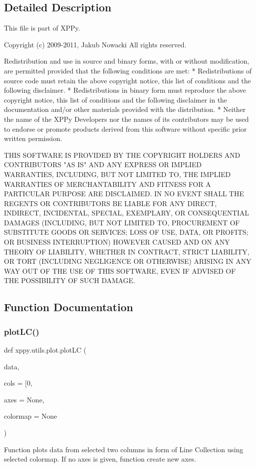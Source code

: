 \subsection{Detailed Description}
\begin{DoxyVerb}This file is part of XPPy.

Copyright (c) 2009-2011, Jakub Nowacki
All rights reserved.

Redistribution and use in source and binary forms, with or without
modification, are permitted provided that the following conditions are met:
    * Redistributions of source code must retain the above copyright
      notice, this list of conditions and the following disclaimer.
    * Redistributions in binary form must reproduce the above copyright
      notice, this list of conditions and the following disclaimer in the
      documentation and/or other materials provided with the distribution.
    * Neither the name of the XPPy Developers nor the
      names of its contributors may be used to endorse or promote products
      derived from this software without specific prior written permission.

THIS SOFTWARE IS PROVIDED BY THE COPYRIGHT HOLDERS AND CONTRIBUTORS "AS IS" AND
ANY EXPRESS OR IMPLIED WARRANTIES, INCLUDING, BUT NOT LIMITED TO, THE IMPLIED
WARRANTIES OF MERCHANTABILITY AND FITNESS FOR A PARTICULAR PURPOSE ARE
DISCLAIMED. IN NO EVENT SHALL THE REGENTS OR CONTRIBUTORS BE LIABLE FOR ANY
DIRECT, INDIRECT, INCIDENTAL, SPECIAL, EXEMPLARY, OR CONSEQUENTIAL DAMAGES
(INCLUDING, BUT NOT LIMITED TO, PROCUREMENT OF SUBSTITUTE GOODS OR SERVICES;
LOSS OF USE, DATA, OR PROFITS; OR BUSINESS INTERRUPTION) HOWEVER CAUSED AND
ON ANY THEORY OF LIABILITY, WHETHER IN CONTRACT, STRICT LIABILITY, OR TORT
(INCLUDING NEGLIGENCE OR OTHERWISE) ARISING IN ANY WAY OUT OF THE USE OF THIS
SOFTWARE, EVEN IF ADVISED OF THE POSSIBILITY OF SUCH DAMAGE.
\end{DoxyVerb}
 

\subsection{Function Documentation}
\mbox{\label{namespacexppy_1_1utils_1_1plot_a76a5b63c867b8095130516cdba1c7533}} 
\subsubsection{\texorpdfstring{plot\+L\+C()}{plotLC()}}
{\footnotesize\ttfamily def xppy.\+utils.\+plot.\+plot\+LC (\begin{DoxyParamCaption}\item[{}]{data,  }\item[{}]{cols = {\ttfamily \mbox{[}0},  }\item[{}]{axes = {\ttfamily None},  }\item[{}]{colormap = {\ttfamily None} }\end{DoxyParamCaption})}

\begin{DoxyVerb}Function plots data from selected two columns in form of Line Collection
using selected colormap. If no axes is given, function create new axes.
\end{DoxyVerb}
 
